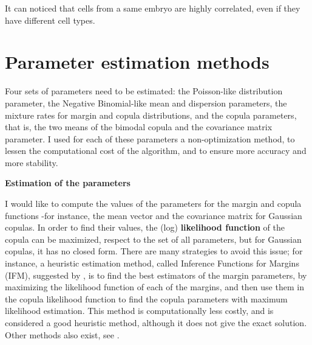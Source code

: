 \documentclass{report}
\begin{document}
{%


It can noticed that cells from a same embryo are highly correlated, even if they have different cell types.

\section*{Parameter estimation methods}

Four sets of parameters need to be estimated: the Poisson-like distribution parameter, the Negative Binomial-like mean and dispersion parameters, the mixture rates for margin and copula distributions, and the copula parameters, that is, the two means of the bimodal copula and the covariance matrix parameter. I used for each of these parameters a non-optimization method, to lessen the computational cost of the algorithm, and to ensure more accuracy and more stability.

\bigskip
\noindent \textbf{Estimation of the parameters}
\bigskip

I would like to compute the values of the parameters for the margin and copula functions -for instance, the mean vector and the covariance matrix for Gaussian copulas.  In order to find their values, the (log) \textbf{likelihood function} of the copula can be maximized, respect to the set of all parameters, but for Gaussian copulas, it has no closed form. There are many strategies to avoid this issue; for instance, a heuristic estimation method, called Inference Functions for Margins (IFM), suggested by \cite{joe1996estimation}, is to find the best estimators of the margin parameters, by maximizing the likelihood function of each of the margins, and then use them in the copula likelihood function to find the copula parameters with maximum likelihood estimation. This method is computationally less costly, and is considered a good heuristic method\cite{bouye2000copulas}, although it does not give the exact solution. Other methods also exist, see \cite{yan2007enjoy}.\\

}
\end{document}
